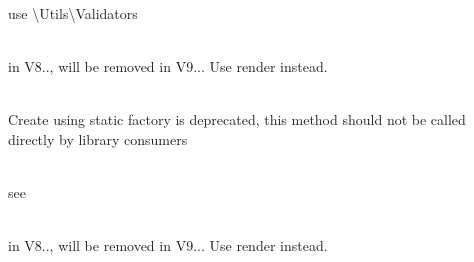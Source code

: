 \begin{DoxyRefList}
\item[Global \doxylink{class_nette_1_1_utils_1_1_reflection_a9f21346ae0e41db27145aa88a2d4a9dd}{Reflection\+::is\+Class\+Keyword} (string \$name)]\hfill \\
\label{deprecated__deprecated000249}%
%
use \textbackslash{}\+Utils\textbackslash{}\+Validators  
\item[Global \doxylink{interface_sabberworm_1_1_c_s_s_1_1_renderable_a7516ca30af0db3cdbf9a7739b48ce91d}{Renderable\+::\+\_\+\+\_\+to\+String} ()]\hfill \\
\label{deprecated__deprecated000397}%
%
in V8.., will be removed in V9... Use {\ttfamily render} instead.  
\item[Global \doxylink{classphp_documentor_1_1_reflection_1_1_doc_block_1_1_tags_1_1_return___a698b22d43114cd3d0a208d8c1c269da0}{Return\+\_\+\+::create} (string \$body, ?\doxylink{classphp_documentor_1_1_reflection_1_1_type_resolver}{Type\+Resolver} \$type\+Resolver=null, ?\doxylink{classphp_documentor_1_1_reflection_1_1_doc_block_1_1_description_factory}{Description\+Factory} \$description\+Factory=null, ?Type\+Context \$context=null)]\hfill \\
\label{deprecated__deprecated000282}%
%
Create using static factory is deprecated, this method should not be called directly by library consumers  
\item[Interface \doxylink{interface_illuminate_1_1_contracts_1_1_validation_1_1_rule}{Rule} ]\hfill \\
\label{deprecated__deprecated000103}%
%
see   
\item[Global \doxylink{class_sabberworm_1_1_c_s_s_1_1_rule_1_1_rule_a7516ca30af0db3cdbf9a7739b48ce91d}{Rule\+::\+\_\+\+\_\+to\+String} ()]\hfill \\
\label{deprecated__deprecated000403}%
%
in V8.., will be removed in V9... Use {\ttfamily render} instead.  
\item[Global \doxylink{class_sabberworm_1_1_c_s_s_1_1_rule_1_1_rule_a0bf04ef34507b82e902c2eddd636b9d3}{Rule\+::add\+Ie\+Hack} (\$i\+Modifier)]\hfill \\

\end{DoxyRefList}
